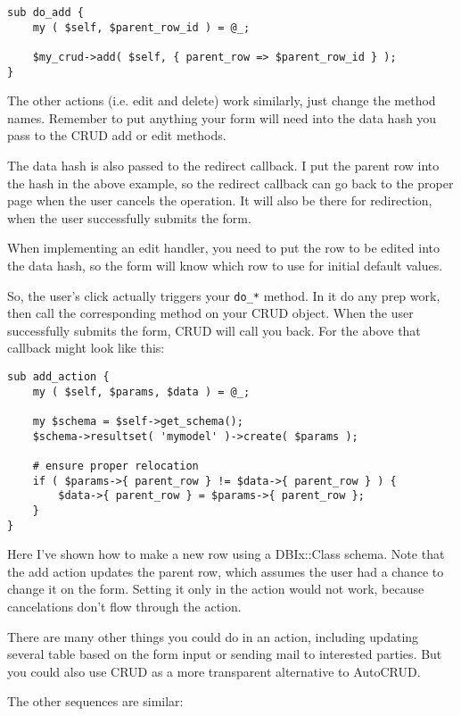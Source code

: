 \begin{verbatim}
sub do_add {
    my ( $self, $parent_row_id ) = @_;

    $my_crud->add( $self, { parent_row => $parent_row_id } );
}
\end{verbatim}

The other actions (i.e. edit and delete) work similarly, just change the
method names.  Remember to put anything your form will need into the data
hash you pass to the CRUD add or edit methods.

The data hash is also passed to the redirect callback.  I put the parent
row into the hash in the above example, so the redirect callback can go
back to the proper page when the user cancels the operation.  It will also
be there for redirection, when the user successfully submits the form.

When implementing an edit handler, you need to put the row to be edited into
the data hash, so the form will know which row to use for initial default
values.

So, the user's click actually triggers your \verb+do_*+ method.  In it
do any prep work, then call the corresponding method on your CRUD object.
When the user successfully submits the form, CRUD will call you back.
For the above that callback might look like this:

\begin{verbatim}
sub add_action {
    my ( $self, $params, $data ) = @_;

    my $schema = $self->get_schema();
    $schema->resultset( 'mymodel' )->create( $params );

    # ensure proper relocation
    if ( $params->{ parent_row } != $data->{ parent_row } ) {
        $data->{ parent_row } = $params->{ parent_row };
    }
}
\end{verbatim}

Here I've shown how to make a new row using a DBIx::Class schema.  Note
that the add action updates the parent row, which assumes the user had
a chance to change it on the form.  Setting it only in the action would
not work, because cancelations don't flow through the action.

There are many other things you could do in an action, including updating
several table based on the form input or sending mail to interested parties.
But you could also use CRUD as a more transparent alternative to AutoCRUD.

The other sequences are similar:

